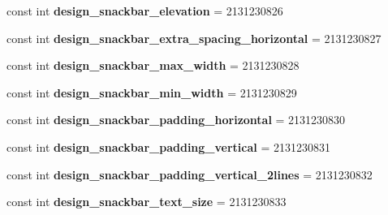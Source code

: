 \begin{DoxyCompactItemize}
\item 
\mbox{\label{classst_delivery_1_1_resource_1_1_dimension_af3691cc440bb4b7b0689895df44f0b19}} 
const int {\bfseries design\+\_\+snackbar\+\_\+elevation} = 2131230826
\item 
\mbox{\label{classst_delivery_1_1_resource_1_1_dimension_a6e4c357216f9f66386844a99381c9a09}} 
const int {\bfseries design\+\_\+snackbar\+\_\+extra\+\_\+spacing\+\_\+horizontal} = 2131230827
\item 
\mbox{\label{classst_delivery_1_1_resource_1_1_dimension_a4a22c49e9874670fea8f6ae848095a80}} 
const int {\bfseries design\+\_\+snackbar\+\_\+max\+\_\+width} = 2131230828
\item 
\mbox{\label{classst_delivery_1_1_resource_1_1_dimension_a9d3f255adf42fb1770042907e8755d5f}} 
const int {\bfseries design\+\_\+snackbar\+\_\+min\+\_\+width} = 2131230829
\item 
\mbox{\label{classst_delivery_1_1_resource_1_1_dimension_a3d0a84d4103cb404a567698c3fc41d70}} 
const int {\bfseries design\+\_\+snackbar\+\_\+padding\+\_\+horizontal} = 2131230830
\item 
\mbox{\label{classst_delivery_1_1_resource_1_1_dimension_aae198dee9b20950f57a5a2626708c540}} 
const int {\bfseries design\+\_\+snackbar\+\_\+padding\+\_\+vertical} = 2131230831
\item 
\mbox{\label{classst_delivery_1_1_resource_1_1_dimension_a7627c61b0fa4528710e8e1235fbfd2b0}} 
const int {\bfseries design\+\_\+snackbar\+\_\+padding\+\_\+vertical\+\_\+2lines} = 2131230832
\item 
\mbox{\label{classst_delivery_1_1_resource_1_1_dimension_a5cfcbe6b63949e3b64247fa2b13e38e6}} 
const int {\bfseries design\+\_\+snackbar\+\_\+text\+\_\+size} = 2131230833
\item 
\mbox{\label{classst_delivery_1_1_resource_1_1_dimension_a14a9740e83a6b1e0fda410f9a2532f27}} 

\end{DoxyCompactItemize}

